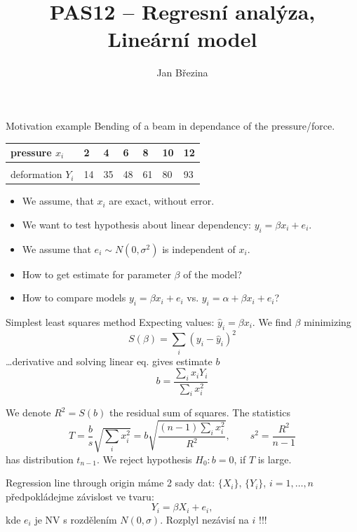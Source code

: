 \documentclass[smaller]{beamer}
\title{PAS12 -- Regresní analýza, Lineární model}
\author{Jan B\v rezina}
\institute %
{
  Technical University of Liberec
}
\def\df#1{{\usebeamercolor[fg]{my orange} #1}}
\def\xskip{{\vspace{2ex}}}
\begin{document}
\begin{frame}
  \titlepage
\end{frame}


\begin{frame}{Motivation example}
 Bending of a beam in dependance of the pressure/force.

 \begin{center}
\begin{tabular}{l|llllll}
pressure $x_i$ & 2 & 4 & 6 & 8 & 10 & 12\\
\hline\\
deformation $Y_i$ & 14 & 35 & 48 & 61 & 80 & 93\\
\end{tabular}
\end{center}

\xskip
\begin{itemize}
  \item We assume, that $x_i$ are exact, without error.
  \item We want to test hypothesis about linear dependency: $y_i= \beta x_i + e_i$.
  \item We assume that $e_i \sim N(0,\sigma^2)$ is independent of $x_i$.
  \item How to get estimate for parameter $\beta$ of the model?
  \item How to compare models $y_i=\beta x_i+e_i$ vs. $y_i=\alpha + \beta x_i +e_i$?
\end{itemize}  
\end{frame}

\begin{frame}{Simplest least squares method}
 Expecting values: $\hat{y}_i = \beta x_i$. We find $\beta$ minimizing
 \[
     S(\beta)= \sum_i (y_i - \hat{y}_i)^2 
 \]
 \dots derivative and solving linear eq. gives estimate $b$
 \[
    b=\frac{\sum_i x_i Y_i}{\sum_i x_i^2}
 \]
 
 We denote $R^2=S(b)$ the \df{residual sum of squares}. The statistics
 \[
    T=\frac{b}{s}\sqrt{\sum_i x_i^2}= b\sqrt{\frac{(n-1)\sum_i x_i^2}{R^2}}, \qquad s^2 = \frac{R^2}{n-1}
 \]
 has distribution $t_{n-1}$. We reject hypothesis $H_0: b=0$, if $T$ is large.
\end{frame}


\begin{frame}{Regression line through origin}
 máme 2 sady dat: $\{X_i\}$, $\{Y_i\}$, $i=1,\dots,n$
 předpokládejme závislost ve tvaru:
 \[
    Y_i = \beta X_i + e_i,
 \]
 kde $e_i$ je NV s rozdělením $N(0,\sigma)$. Rozplyl nezávisí na $i$ !!! 
 
\end{frame}
\end{document}
